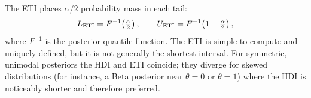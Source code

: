 The ETI places $\alpha/2$ probability mass in each tail:
\begin{equation}\label{eq:eti}
  L_{\rm ETI} = F^{-1}\!\left(\tfrac{\alpha}{2}\right), \qquad
  U_{\rm ETI} = F^{-1}\!\left(1 - \tfrac{\alpha}{2}\right),
\end{equation}
where $F^{-1}$ is the posterior quantile function. The ETI is simple to compute and
uniquely defined, but it is not generally the shortest interval.
For symmetric, unimodal posteriors the HDI and ETI coincide; they diverge for skewed
distributions (for instance, a Beta posterior near $\theta = 0$ or $\theta = 1$)
where the HDI is noticeably shorter and therefore preferred.


